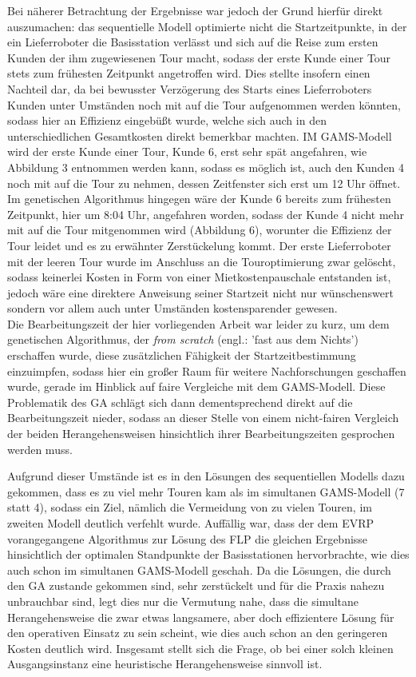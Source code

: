 \documentclass[a4paper,12pt,parskip,bibtotoc,liststotoc]{article}
\begin{document}
Bei näherer Betrachtung der Ergebnisse war jedoch der Grund hierfür direkt auszumachen: das sequentielle Modell optimierte nicht die Startzeitpunkte, in der ein Lieferroboter die Basisstation verlässt und sich auf die Reise zum ersten Kunden der ihm zugewiesenen Tour macht, sodass der erste Kunde einer Tour stets zum frühesten Zeitpunkt angetroffen wird.
Dies stellte insofern einen Nachteil dar, da bei bewusster Verzögerung des Starts eines Lieferroboters Kunden unter Umständen noch mit auf die Tour aufgenommen werden könnten, sodass hier an Effizienz eingebüßt wurde, welche sich auch in den unterschiedlichen Gesamtkosten direkt bemerkbar machten. 
IM GAMS-Modell wird der erste Kunde einer Tour, Kunde 6, erst sehr spät angefahren, wie Abbildung 3 entnommen werden kann, sodass es möglich ist, auch den Kunden 4 noch mit auf die Tour zu nehmen, dessen Zeitfenster sich erst um 12 Uhr öffnet. 
Im genetischen Algorithmus hingegen wäre der Kunde 6 bereits zum frühesten Zeitpunkt, hier um 8:04 Uhr, angefahren worden, sodass der Kunde 4 nicht mehr mit auf die Tour mitgenommen wird (Abbildung 6), worunter die Effizienz der Tour leidet und es zu erwähnter Zerstückelung kommt.
Der erste Lieferroboter mit der leeren Tour wurde im Anschluss an die Touroptimierung zwar gelöscht, sodass keinerlei Kosten in Form von einer Mietkostenpauschale entstanden ist, jedoch wäre eine direktere Anweisung seiner Startzeit nicht nur wünschenswert sondern vor allem auch unter Umständen kostensparender gewesen.\\

Die Bearbeitungszeit der hier vorliegenden Arbeit war leider zu kurz, um dem genetischen Algorithmus, der \textit{from scratch} (engl.: 'fast aus dem Nichts') erschaffen wurde, diese zusätzlichen Fähigkeit der Startzeitbestimmung einzuimpfen, sodass hier ein großer Raum für weitere Nachforschungen geschaffen wurde, gerade im Hinblick auf faire Vergleiche mit dem GAMS-Modell.
Diese Problematik des GA schlägt sich dann dementsprechend direkt auf die Bearbeitungszeit nieder, sodass an dieser Stelle von einem nicht-fairen Vergleich der beiden Herangehensweisen hinsichtlich ihrer Bearbeitungszeiten gesprochen werden muss.

Aufgrund dieser Umstände ist es in den Lösungen des sequentiellen Modells dazu gekommen, dass es zu viel mehr Touren kam als im simultanen GAMS-Modell (7 statt 4), sodass ein Ziel, nämlich die Vermeidung von zu vielen Touren, im zweiten Modell deutlich verfehlt wurde.
Auffällig war, dass der dem EVRP vorangegangene Algorithmus zur Lösung des FLP die gleichen Ergebnisse hinsichtlich der optimalen Standpunkte der Basisstationen hervorbrachte, wie dies auch schon im simultanen GAMS-Modell geschah. 
Da die Lösungen, die durch den GA zustande gekommen sind, sehr zerstückelt und für die Praxis nahezu unbrauchbar sind, legt dies nur die Vermutung nahe, dass die simultane Herangehensweise die zwar etwas langsamere, aber doch effizientere Lösung für den operativen Einsatz zu sein scheint, wie dies auch schon an den geringeren Kosten deutlich wird.	
Insgesamt stellt sich die Frage, ob bei einer solch kleinen Ausgangsinstanz eine heuristische Herangehensweise sinnvoll ist.
\end{document}
